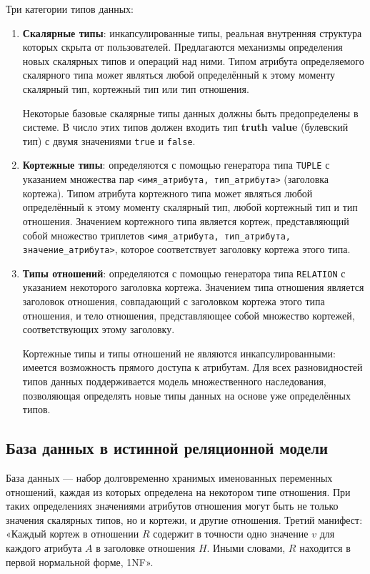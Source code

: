 \documentclass[a4paper,12pt]{article}
\begin{document}
Три категории типов данных:
\begin{enumerate}
    \item \textbf{Скалярные типы}: инкапсулированные типы, реальная внутренняя структура которых скрыта от пользователей. Предлагаются механизмы определения новых скалярных типов и операций над ними. Типом атрибута определяемого скалярного типа может являться любой определённый к этому моменту скалярный тип, кортежный тип или тип отношения.
    
    Некоторые базовые скалярные типы данных должны быть предопределены в системе. В число этих типов должен входить тип \textbf{truth value} (булевский тип) с двумя значениями \texttt{true} и \texttt{false}.
    
    \item \textbf{Кортежные типы}: определяются с помощью генератора типа \texttt{TUPLE} с указанием множества пар \texttt{<имя\_атрибута, тип\_атрибута>} (заголовка кортежа). Типом атрибута кортежного типа может являться любой определённый к этому моменту скалярный тип, любой кортежный тип и тип отношения. Значением кортежного типа является кортеж, представляющий собой множество триплетов \texttt{<имя\_атрибута, тип\_атрибута, значение\_атрибута>}, которое соответствует заголовку кортежа этого типа.
    
    \item \textbf{Типы отношений}: определяются с помощью генератора типа \texttt{RELATION} с указанием некоторого заголовка кортежа. Значением типа отношения является заголовок отношения, совпадающий с заголовком кортежа этого типа отношения, и тело отношения, представляющее собой множество кортежей, соответствующих этому заголовку.
    
    Кортежные типы и типы отношений не являются инкапсулированными: имеется возможность прямого доступа к атрибутам. Для всех разновидностей типов данных поддерживается модель множественного наследования, позволяющая определять новые типы данных на основе уже определённых типов.
\end{enumerate}

\subsection{База данных в истинной реляционной модели}

База данных --- набор долговременно хранимых именованных переменных отношений, каждая из которых определена на некотором типе отношения. При таких определениях значениями атрибутов отношения могут быть не только значения скалярных типов, но и кортежи, и другие отношения. Третий манифест: «Каждый кортеж в отношении $R$ содержит в точности одно значение $v$ для каждого атрибута $A$ в заголовке отношения $H$. Иными словами, $R$ находится в первой нормальной форме, 1NF».
\end{document}
